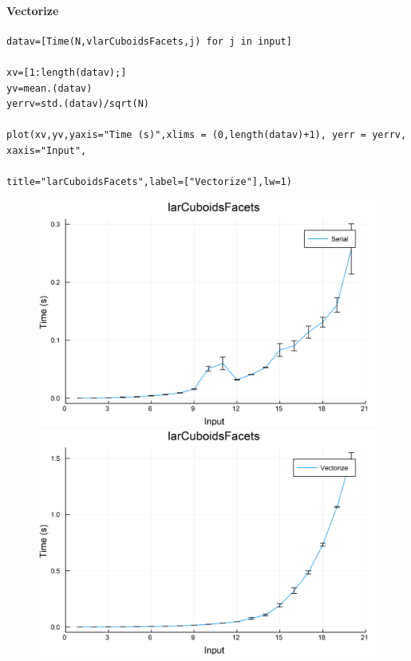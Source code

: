 \documentclass{article}
\begin{document}
\paragraph{Vectorize}
\begin{flushleft}\small
\begin{list}{}{} \item
    \begin{Verbatim}[tabsize=4]
datav=[Time(N,vlarCuboidsFacets,j) for j in input]

xv=[1:length(datav);]
yv=mean.(datav)
yerrv=std.(datav)/sqrt(N)

plot(xv,yv,yaxis="Time (s)",xlims = (0,length(datav)+1), yerr = yerrv, xaxis="Input",   
                                        title="larCuboidsFacets",label=["Vectorize"],lw=1)
    \end{Verbatim}
\end{list}
\end{flushleft}

\begin{figure}[h!]
\centering
\includegraphics[scale=0.06]{larCuboidsFacetsSer.png}
\includegraphics[scale=0.06]{larCuboidsFacetsVec.png}
\end{figure}
\end{document}

